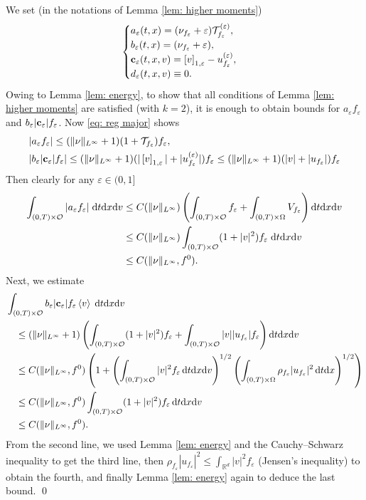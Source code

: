 \documentclass[10pt, reqno]{amsart}
\theoremstyle{plain}
\theoremstyle{definition}
\theoremstyle{remark}
\renewenvironment{proof}[1][\proofname]{\noindent{\scshape #1.\quad}}{\qed}
\numberwithin{equation}{section}
\newcommand{\bfc}{{\bf c}}
\newcommand{\calO}{\mathcal O}
\newcommand{\calT}{\mathcal T}
\newcommand{\R}{\mathbb{R}}
\newcommand{\ve}{\varepsilon}
\newcommand{\dx}{\textnormal{d}x}
\newcommand{\dv}{\textnormal{d}v}
\newcommand{\dt}{\textnormal{d}t}
\newcommand{\lt}{\left}
\newcommand{\rt}{\right}
\newcommand{\intr}{\int_{\R^d}}
\newcommand{\renorm}[3]{\lt[#1\rt]_{#2 , #3}}
\begin{document}
\begin{proof}
We set (in the notations of Lemma \ref{lem: higher moments})
\begin{align*}
    \begin{cases}
        a_\ve(t,x) = (\nu_{f_\ve} + \ve) \calT_{f_\ve}^{(\ve)} , \\
        b_\ve(t,x) = (\nu_{f_\ve} + \ve), \\
        \bfc_\ve(t,x,v) = \renorm{v}{1}{\ve} - u_{f_\ve}^{(\ve)}, \\
        d_\ve(t,x,v) \equiv 0.
    \end{cases}
\end{align*}
Owing to Lemma \ref{lem: energy}, to show that all conditions of Lemma \ref{lem: higher moments} are satisfied (with $k=2$), it is enough to obtain bounds for $a_\ve f_\ve$ and $b_\ve |\bfc_\ve| f_\ve$. Now \eqref{eq: reg major} shows
\begin{align*}
    &|a_\ve f_\ve| \le  (\|\nu\|_{L^\infty} + 1) (1 + \calT_{f_\ve}) f_\ve, \\
    &|b_\ve |\bfc_\ve| f_\ve| \le (\|\nu\|_{L^\infty} + 1) (| \renorm{v}{1}{\ve}| + |u_{f_\ve}^{(\ve)}|) f_\ve \le (\|\nu\|_{L^\infty}+1) (|v| + |u_{f_\ve}|) f_\ve
\end{align*}
Then clearly for any $\ve\in (0,1]$
\begin{align*}
    \int_{(0,T)\times \calO} |a_\ve f_\ve| \;\dt\dx\dv  &\le C(\|\nu\|_{L^\infty}) \lt(\int_{(0,T)\times \calO} f_\ve + \int_{(0,T)\times \Omega} V_{f_\ve} \rt)\dt\dx\dv \\
    &\le C(\|\nu\|_{L^\infty}) \int_{(0,T)\times \calO} (1+|v|^2) f_\ve  \;\dt\dx\dv \\
    &\le C(\|\nu\|_{L^\infty}, f^0).
\end{align*}
Next, we estimate
\begin{align*}
    &\int_{(0,T)\times \calO} b_\ve |\bfc_\ve| f_\ve \lt<v\rt> \;\dt\dx\dv\\
    &\quad\le (\|\nu\|_{L^\infty}+1) \lt(\int_{(0,T)\times \calO} (1+|v|^2) f_\ve + \int_{(0,T)\times \calO} |v| |u_{f_\ve}| f_\ve \rt) \dt\dx\dv \\
    &\quad\le C(\|\nu\|_{L^\infty}, f^0) \lt(1 + \lt(\int_{(0,T)\times \calO} |v|^2 f_\ve \,\dt\dx\dv \rt)^{1/2} \lt(\int_{(0,T)\times \Omega} \rho_{f_\ve} |u_{f_\ve}|^2 \,\dt\dx \rt)^{1/2} \rt) \\
    &\quad\le C(\|\nu\|_{L^\infty},f^0) \int_{(0,T)\times\calO} (1+|v|^2) f_\ve \,\dt\dx\dv \\
    &\quad\le C(\|\nu\|_{L^\infty}, f^0) .
\end{align*}
From the second line, we used Lemma \ref{lem: energy} and the Cauchy--Schwarz inequality to get the third line, then $\rho_{f_\ve}|u_{f_\ve}|^2 \le \intr |v|^2 f_\ve$ (Jensen's inequality) to obtain the fourth, and finally Lemma \ref{lem: energy} again to deduce the last bound.
\end{proof}
\end{document}
